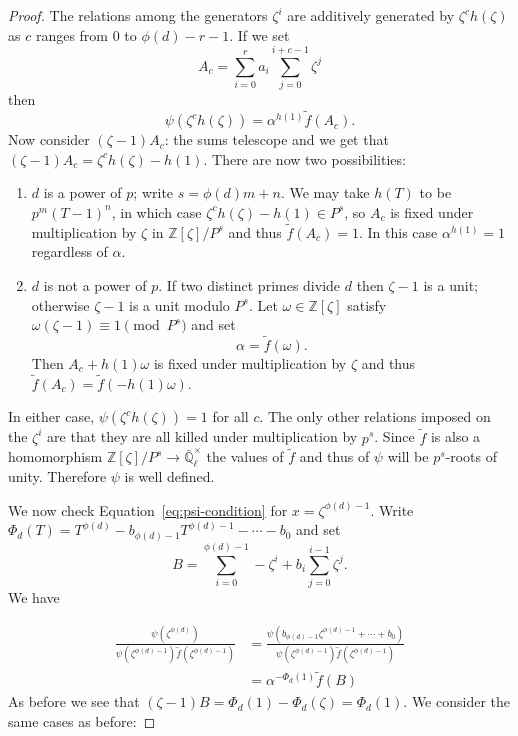 \documentclass[11pt]{amsart}
\theoremstyle{plain}
\theoremstyle{definition}
\theoremstyle{remark}
\newcommand{\ZZ}{{\mathbb{Z}}}
\newcommand{\EE}{\mathbb{\bar Q}_\ell}
\newcommand{\EEx}{\EE^\times}
\begin{document}
\begin{proof}
  The relations among the generators $\zeta^i$ are additively
  generated by $\zeta^ch(\zeta)$ as $c$ ranges from $0$ to
  $\phi(d)-r-1$.  If we set
  $$A_c = \sum_{i=0}^r a_i \sum_{j=0}^{i+c-1} \zeta^j$$
  then
  $$\psi(\zeta^ch(\zeta)) = \alpha^{h(1)} \tilde{f}(A_c).$$
  Now consider $(\zeta - 1)A_c$: the sums telescope and we get that
  $(\zeta-1)A_c = \zeta^ch(\zeta) - h(1).$ There are now two
  possibilities:
  \begin{enumerate}
  \item $d$ is a power of $p$; write $s = \phi(d)m + n$.  We may take
    $h(T)$ to be $p^m(T-1)^n$, in which case $\zeta^ch(\zeta) - h(1) \in P^s$,
    so $A_c$ is fixed under multiplication by $\zeta$ in
    $\ZZ[\zeta]/P^s$ and thus $\tilde{f}(A_c) = 1$.  In this case
    $\alpha^{h(1)} = 1$ regardless of $\alpha$.
  \item $d$ is not a power of $p$.  If two distinct primes divide $d$
    then $\zeta - 1$ is a unit; otherwise $\zeta - 1$ is a unit modulo
    $P^s$.  Let $\omega \in \ZZ[\zeta]$ satisfy
    $\omega(\zeta - 1) \equiv 1 \pmod{P^s}$ and set
    \begin{equation} \label{alpha-def}
      \alpha = \tilde{f}(\omega).
    \end{equation}
    Then $A_c + h(1)\omega$ is fixed under multiplication by $\zeta$
    and thus $\tilde{f}(A_c) = \tilde{f}(-h(1)\omega)$.
  \end{enumerate}
  In either case, $\psi(\zeta^ch(\zeta)) = 1$ for all $c$.  The only
  other relations imposed on the $\zeta^i$ are that they are all
  killed under multiplication by $p^s$.  Since $\tilde{f}$ is also a
  homomorphism $\ZZ[\zeta]/P^s \rightarrow \EEx$ the values of
  $\tilde{f}$ and thus of $\psi$ will be $p^s$-roots of unity.
  Therefore $\psi$ is well defined.

  We now check Equation~\eqref{eq:psi-condition} for
  $x = \zeta^{\phi(d)-1}$.  Write
  $\Phi_d(T) = T^{\phi(d)} - b_{\phi(d)-1}T^{\phi(d)-1} - \cdots - b_0$
  and set
  $$B = \sum_{i=0}^{\phi(d)-1} -\zeta^i + b_i \sum_{j=0}^{i-1} \zeta^j.$$
  We have

  \begin{align*}
    \frac{\psi(\zeta^{\phi(d)})}{\psi(\zeta^{\phi(d)-1})\tilde{f}(\zeta^{\phi(d)-1})}
    &= \frac{\psi(b_{\phi(d)-1}\zeta^{\phi(d)-1} + \cdots + b_0)}{\psi(\zeta^{\phi(d)-1})\tilde{f}(\zeta^{\phi(d)-1})} \\
    &= \alpha^{-\Phi_d(1)} \tilde{f}(B)
  \end{align*}
  As before we see that $(\zeta - 1)B = \Phi_d(1) - \Phi_d(\zeta) = \Phi_d(1)$.
  We consider the same cases as before:


\end{proof}
\end{document}

